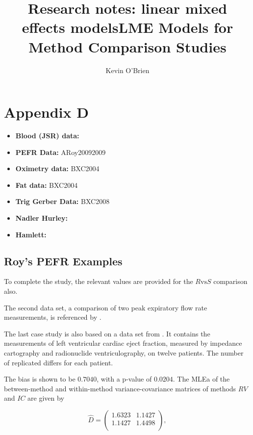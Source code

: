 \documentclass[12pt, a4paper]{report}
\title{Research notes: linear mixed effects models}
\author{ } \date{ }
\theoremstyle{plain}
\theoremstyle{definition}
\theoremstyle{remark}
\begin{document}
\author{Kevin O'Brien}
\title{LME Models for Method Comparison Studies}

\chapter{Appendix D}
\begin{itemize}
	\item \textbf{Blood (JSR) data:} 
	\item \textbf{PEFR Data:} ARoy20092009
	\item \textbf{Oximetry data:} BXC2004
	\item \textbf{Fat data:} BXC2004
	\item \textbf{Trig Gerber Data:} BXC2008
	\item \textbf{Nadler Hurley:}
	\item \textbf{Hamlett:}
\end{itemize}




\section{Roy's PEFR Examples}



To complete the study, the relevant values are provided for the $R \mbox{vs} S$ comparison also.


The second data set, a comparison of two peak expiratory flow rate measurements, is referenced by \citet{BA86}.


The last case study is also based on a data set from  \citet{BA99}. It contains the measurements of left ventricular cardiac eject fraction, measured by impedance cartography and radionuclide ventriculography, on twelve patients.
The number of replicated differs for each patient.

The bias is shown to be $0.7040$, with a p-value of $0.0204$. The MLEa of the between-method and within-method variance-covariance matrices of methods $RV$ and $IC$ are given by

\begin{equation}\hat{D}=\left(
\begin{array}{cc}
1.6323 & 1.1427 \\
1.1427 & 1.4498 \\
\end{array}
\right),
\end{equation}
\end{document}
